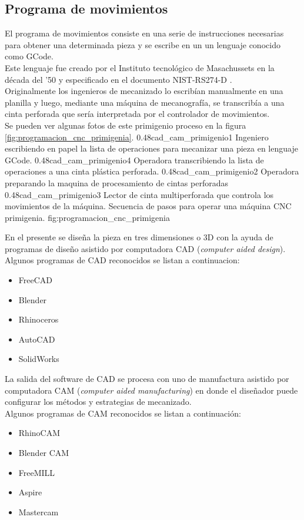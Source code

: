 \subsection{Programa de movimientos}
   El programa de movimientos consiste en una serie de instrucciones necesarias para obtener una determinada pieza y se escribe en un un lenguaje conocido como GCode\citep{WEBSITE:gcode_wiki}.\\
   Este lenguaje fue creado por el Instituto tecnológico de Masachussets en la década del '50 y especificado en el documento NIST-RS274-D \citep{rs274}.\\
Originalmente los ingenieros de mecanizado lo escribían manualmente en una planilla y luego, mediante una máquina de mecanografía, se transcribía a una cinta perforada que sería interpretada por el controlador de movimientos.\\
Se pueden ver algunas fotos de este primigenio proceso en la figura \ref{fig:programacion_cnc_primigenia}.
\subfigtwotwo
          {0.48}{cad_cam_primigenio1} {Ingeniero escribiendo en papel la lista de operaciones para mecanizar una pieza en lenguaje GCode.}
          {0.48}{cad_cam_primigenio4} {Operadora transcribiendo la lista de operaciones a una cinta plástica perforada.}
          {0.48}{cad_cam_primigenio2} {Operadora preparando la maquina de procesamiento de cintas perforadas}
          {0.48}{cad_cam_primigenio3} {Lector de cinta multiperforada que controla los movimientos de la máquina.}
          {Secuencia de pasos para operar una máquina CNC primigenia.}
          {fig:programacion_cnc_primigenia}


          En el presente se diseña la pieza en tres dimensiones o 3D con la ayuda de programas de diseño asistido por computadora CAD  (\textit{computer aided design}).\\
          Algunos programas de CAD reconocidos se listan a continuacion:
          \begin{itemize}
             \item{FreeCAD}
             \item{Blender}
             \item{Rhinoceros}
             \item{AutoCAD}
             \item{SolidWorks}
          \end{itemize}
   La salida del software de CAD se procesa con uno de manufactura asistido por computadora CAM (\textit{computer aided manufacturing}) en donde el diseñador puede configurar los métodos y estrategias de mecanizado.\\
          Algunos programas de CAM reconocidos se listan a continuación:
          \begin{itemize}
             \item{RhinoCAM}
             \item{Blender CAM}
             \item{FreeMILL}
             \item{Aspire}
             \item{Mastercam}
          \end{itemize}

